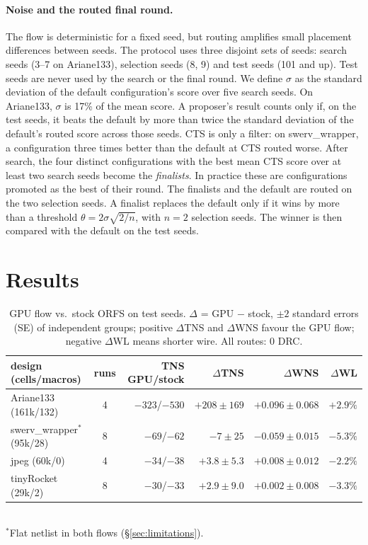 \documentclass[sigconf]{acmart}
\begin{document}
\paragraph{Noise and the routed final round.}
The flow is deterministic for a fixed seed, but routing amplifies small
placement differences between seeds. The protocol uses three disjoint sets of
seeds: search seeds (3--7 on Ariane133), selection seeds (8, 9) and test seeds
(101 and up). Test seeds are never used by the search or the final round. We define $\sigma$ as the standard
deviation of the default configuration's score over five search seeds. On
Ariane133, $\sigma$ is 17\% of the mean score. A proposer's result
counts only if, on the test seeds, it beats the default by more than twice the
standard deviation of the default's routed score across those seeds. CTS is only a filter: on
swerv\_wrapper, a configuration three times better than the default at CTS
routed worse. After search, the four distinct configurations with the best mean CTS
score over at least two search seeds become the \emph{finalists}. In practice
these are configurations promoted as the best of their round. The finalists and the
default are routed on the two selection seeds. A finalist
replaces the default only if it wins by more than
a threshold $\theta = 2\sigma\sqrt{2/n}$, with $n=2$ selection seeds. The winner
is then compared with the default on the test seeds.

\section{Results}
\label{sec:results}
\begin{table}[t]
  \caption{GPU flow vs.\ stock ORFS on test seeds. {\normalfont $\Delta$ = GPU
  $-$ stock, $\pm 2$ standard errors (SE) of independent groups; positive
  $\Delta$TNS and $\Delta$WNS favour the GPU flow; negative $\Delta$WL means
  shorter wire. All routes: 0 DRC.}}
  \label{tab:stock}
  \footnotesize
  \setlength{\tabcolsep}{2pt}
  \begin{tabular*}{\columnwidth}{@{\extracolsep{\fill}}lcrrrr@{}}
    \toprule
    design (cells/macros) & runs & TNS GPU/stock & $\Delta$TNS & $\Delta$WNS & $\Delta$WL \\
    \midrule
    Ariane133 (161k/132) & 4 & $-323$/$-530$ & $+208{\pm}169$ & $+0.096{\pm}0.068$ & $+2.9\%$ \\
    swerv\_wrapper$^\ast$ (95k/28) & 8 & $-69$/$-62$ & $-7{\pm}25$ & $-0.059{\pm}0.015$ & $-5.3\%$ \\
    jpeg (60k/0) & 4 & $-34$/$-38$ & $+3.8{\pm}5.3$ & $+0.008{\pm}0.012$ & $-2.2\%$ \\
    tinyRocket (29k/2) & 8 & $-30$/$-33$ & $+2.9{\pm}9.0$ & $+0.002{\pm}0.008$ & $-3.3\%$ \\
    \bottomrule
  \end{tabular*}\\[2pt]
  {\footnotesize $^\ast$Flat netlist in both flows (\S\ref{sec:limitations}).}
\end{table}
\end{document}
